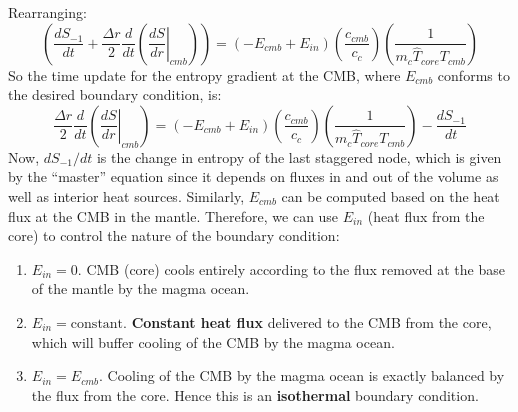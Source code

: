 Rearranging:
\begin{equation}
\left( \frac{dS_{-1}}{dt} + \frac{\Delta r}{2} \frac{d}{dt} \left( \left. \frac{dS}{dr} \right |_{cmb} \right)  \right) = (-E_{cmb}+E_{in}) \left( \frac{c_{cmb}}{c_c} \right) \left( \frac{1}{m_c \hat{T}_{core} T_{cmb}} \right)
\end{equation}
So the time update for the entropy gradient at the CMB, where $E_{cmb}$ conforms to the desired boundary condition, is:
\begin{equation}
\frac{\Delta r}{2} \frac{d}{dt} \left( \left. \frac{dS}{dr} \right |_{cmb} \right) = (-E_{cmb}+E_{in}) \left( \frac{c_{cmb}}{c_c} \right) \left( \frac{1}{m_c \hat{T}_{core} T_{cmb}} \right) - \frac{dS_{-1}}{dt}
\end{equation}
Now, $dS_{-1}/dt$ is the change in entropy of the last staggered node, which is given by the ``master'' equation since it depends on fluxes in and out of the volume as well as interior heat sources.  Similarly, $E_{cmb}$ can be computed based on the heat flux at the CMB in the mantle.  Therefore, we can use $E_{in}$ (heat flux from the core) to control the nature of the boundary condition:
\begin{enumerate}
\item $E_{in}=0$.  CMB (core) cools entirely according to the flux removed at the base of the mantle by the magma ocean.
\item $E_{in}=\text{constant}$.  \textbf{Constant heat flux} delivered to the CMB from the core, which will buffer cooling of the CMB by the magma ocean.
\item $E_{in}=E_{cmb}$.  Cooling of the CMB by the magma ocean is exactly balanced by the flux from the core.  Hence this is an \textbf{isothermal} boundary condition.
\end{enumerate}
